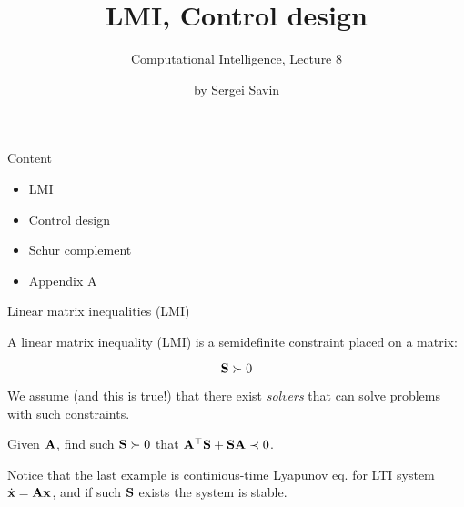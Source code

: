 \documentclass{beamer}
\title{LMI, Control design}
\subtitle{Computational Intelligence, Lecture 8}
\author{by Sergei Savin}
\date{\mydate}
\begin{document}
\maketitle


\begin{frame}{Content}
	
	\begin{itemize}
		\item LMI
		\item Control design
		\item Schur complement
		\item Appendix A
	\end{itemize}
	
	
\end{frame}




\begin{frame}{Linear matrix inequalities (LMI)}
	\begin{flushleft}
		
		A linear matrix inequality (LMI) is a semidefinite constraint placed on a matrix:
		
		\begin{equation}
			\mathbf{S} \succ 0
		\end{equation}
		
		We assume (and this is true!) that there exist \emph{solvers} that can solve problems with such constraints. 
		
		
		\begin{example}
			Given $\mathbf{A}$, find such $\mathbf{S}\succ 0$ that $\mathbf{A}^\top\mathbf{S} + \mathbf{S}\mathbf{A} \prec 0$.
		\end{example}
		
		Notice that the last example is continious-time Lyapunov eq. for LTI system $\dot{\mathbf{x}} = \mathbf{A}\mathbf{x}$, and if such $\mathbf{S}$ exists the system is stable. 
		
	\end{flushleft}
\end{frame}
\end{document}
